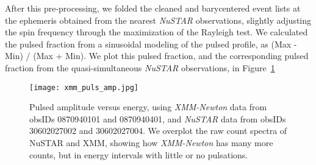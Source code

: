 \documentclass[twocolumn]{aastex631}
\newcommand{\xmm}{{\it XMM-Newton}\xspace}
\newcommand{\nustar}{\textit{NuSTAR}\xspace}
\newcommand{\figref}{Figure~\ref}
\begin{document}
After this pre-processing, we folded the cleaned and barycentered event lists at the ephemeris obtained from the nearest \nustar observations, slightly adjusting the spin frequency through the maximization of the Rayleigh test.
We calculated the pulsed fraction from a sinusoidal modeling of the pulsed profile, as (Max - Min) / (Max + Min).
We plot this pulsed fraction, and the corresponding pulsed fraction from the quasi-simultaneous \nustar observations, in \figref{fig:xmm_pulse_amp}

\begin{figure}
    \centering
    \texttt{[image: xmm\_puls\_amp.jpg]}
    \caption{Pulsed amplitude versus energy, using \xmm data from obsIDs 0870940101 and 0870940401, and \nustar data from obsIDs 30602027002 and 30602027004.
    We overplot the raw count spectra of NuSTAR and XMM, showing how \xmm has many more counts, but in energy intervals with little or no pulsations.}
    \label{fig:xmm_pulse_amp}
\end{figure}
\end{document}
